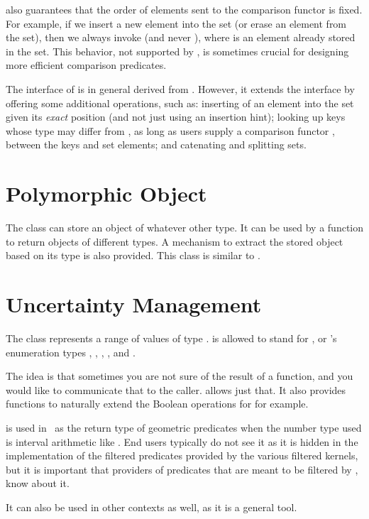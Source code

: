  also guarantees that the order of
elements sent to the comparison functor is fixed. For example, if we insert
a new element  into the set (or erase an element from the set), then
we always invoke  (and never ),
where  is an element already stored in the set. This behavior, not
supported by , is sometimes crucial for designing more
efficient comparison predicates.


The interface of  is in general
derived from . However, it extends the interface by
offering some additional operations, such as: inserting of an element into
the set given its {\em exact} position (and not just using an insertion hint);
looking up keys whose type may differ from , as long as users supply
a comparison functor , between the keys and set elements;
and catenating and splitting sets.

\section{Polymorphic Object}

The class  can store an object of whatever other type.
It can be used by a function to return objects of different types.
A mechanism to extract the stored object based on its type is also provided.
This class is similar to .

\section{Uncertainty Management}

The class  represents a range of values of type .
 is allowed to stand for , or \cgal's enumeration types
, , , ,
 and .

The idea is that sometimes you are not sure of the result of a function,
and you would like to communicate that to the caller.  
allows just that.  It also provides functions to naturally extend the
Boolean operations for  for example.

 is used in \cgal\ as the return type of geometric predicates
when the number type used is interval arithmetic like .
End users typically do not see it as it is hidden in the implementation
of the filtered predicates provided by the various filtered kernels,
but it is important that providers of predicates that are meant to be
filtered by , know about it.

It can also be used in other contexts as well, as it is a general tool.
